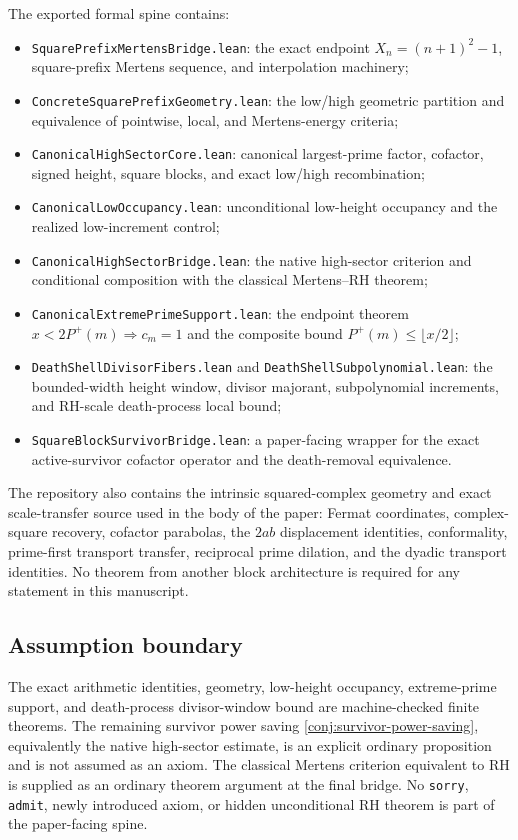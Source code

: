 \documentclass[11pt]{article}
\theoremstyle{definition}
\newcommand{\1}{\mathbf{1}}
\begin{document}
The exported formal spine contains:
\begin{itemize}
\item \texttt{SquarePrefixMertensBridge.lean}: the exact endpoint $X_n=(n+1)^2-1$, square-prefix Mertens sequence, and interpolation machinery;
\item \texttt{ConcreteSquarePrefixGeometry.lean}: the low/high geometric partition and equivalence of pointwise, local, and Mertens-energy criteria;
\item \texttt{CanonicalHighSectorCore.lean}: canonical largest-prime factor, cofactor, signed height, square blocks, and exact low/high recombination;
\item \texttt{CanonicalLowOccupancy.lean}: unconditional low-height occupancy and the realized low-increment control;
\item \texttt{CanonicalHighSectorBridge.lean}: the native high-sector criterion and conditional composition with the classical Mertens--RH theorem;
\item \texttt{CanonicalExtremePrimeSupport.lean}: the endpoint theorem $x<2P^+(m)\Rightarrow c_m=1$ and the composite bound $P^+(m)\le\lfloor x/2\rfloor$;
\item \texttt{DeathShellDivisorFibers.lean} and \texttt{DeathShellSubpolynomial.lean}: the bounded-width height window, divisor majorant, subpolynomial increments, and RH-scale death-process local bound;
\item \texttt{SquareBlockSurvivorBridge.lean}: a paper-facing wrapper for the exact active-survivor cofactor operator and the death-removal equivalence.
\end{itemize}

The repository also contains the intrinsic squared-complex geometry and exact scale-transfer source used in the body of the paper: Fermat coordinates, complex-square recovery, cofactor parabolas, the $2ab$ displacement identities, conformality, prime-first transport transfer, reciprocal prime dilation, and the dyadic transport identities.  No theorem from another block architecture is required for any statement in this manuscript.

\subsection{Assumption boundary}

The exact arithmetic identities, geometry, low-height occupancy, extreme-prime support, and death-process divisor-window bound are machine-checked finite theorems.  The remaining survivor power saving \cref{conj:survivor-power-saving}, equivalently the native high-sector estimate, is an explicit ordinary proposition and is not assumed as an axiom.  The classical Mertens criterion equivalent to RH is supplied as an ordinary theorem argument at the final bridge.  No \texttt{sorry}, \texttt{admit}, newly introduced axiom, or hidden unconditional RH theorem is part of the paper-facing spine.
\end{document}
